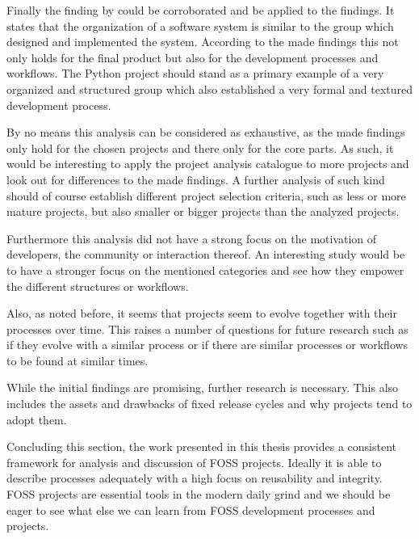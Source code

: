 Finally the finding by \textcite{Conway1968} could be corroborated and be
applied to the findings. It states that the organization of a software system
is similar to the group which designed and implemented the system. According to
the made findings this not only holds for the final product but also for the
development processes and workflows. The Python project should stand as a
primary example of a very organized and structured group which also established
a very formal and textured development process.

By no means this analysis can be considered as exhaustive, as the made findings
only hold for the chosen projects and there only for the core parts. As such,
it would be interesting to apply the project analysis catalogue to more
projects and look out for differences to the made findings. A further analysis
of such kind should of course establish different project selection criteria,
such as less or more mature projects, but also smaller or bigger projects than
the analyzed projects.

Furthermore this analysis did not have a strong focus on the motivation of
developers, the community or interaction thereof. An interesting study would be
to have a stronger focus on the mentioned categories and see how they empower
the different structures or workflows.

Also, as noted before, it seems that projects seem to evolve together with
their processes over time. This raises a number of questions for future
research such as if they evolve with a similar process or if there are similar
processes or workflows to be found at similar times.

While the initial findings are promising, further research is necessary. This
also includes the assets and drawbacks of fixed release cycles and why projects
tend to adopt them.

Concluding this section, the work presented in this thesis provides a
consistent framework for analysis and discussion of \ac{FOSS} projects. Ideally
it is able to describe processes adequately with a high focus on reusability
and integrity. \acl{FOSS} projects are essential tools in the modern
daily grind and we should be eager to see what else we can learn from
\acl{FOSS} development processes and projects.

